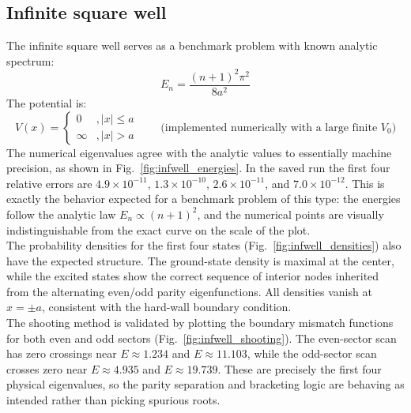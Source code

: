 \documentclass[11pt]{article}
\begin{document}
\begin{refsection}
        \subsection{Infinite square well}
            The infinite square well serves as a benchmark problem with known analytic spectrum:
            \begin{equation}
            E_n = \frac{(n+1)^2\pi^2}{8a^2}
            \end{equation}
            The potential is:
            \begin{equation}
            V(x)=\begin{cases}
            0 & ,|x|\le a\\
            \infty & ,|x|>a
            \end{cases}
            \qquad \text{(implemented numerically with a large finite }V_0\text{)}
            \end{equation}
            The numerical eigenvalues agree with the analytic values to essentially machine precision, as shown in Fig.~\ref{fig:infwell_energies}. In the saved run the first four relative errors are $4.9\times10^{-11}$, $1.3\times10^{-10}$, $2.6\times10^{-11}$, and $7.0\times10^{-12}$. This is exactly the behavior expected for a benchmark problem of this type: the energies follow the analytic law $E_n \propto (n+1)^2$, and the numerical points are visually indistinguishable from the exact curve on the scale of the plot. \\

            The probability densities for the first four states (Fig.~\ref{fig:infwell_densities}) also have the expected structure. The ground-state density is maximal at the center, while the excited states show the correct sequence of interior nodes inherited from the alternating even/odd parity eigenfunctions. All densities vanish at $x=\pm a$, consistent with the hard-wall boundary condition. \\

            The shooting method is validated by plotting the boundary mismatch functions for both even and odd sectors (Fig.~\ref{fig:infwell_shooting}). The even-sector scan has zero crossings near $E\approx1.234$ and $E\approx11.103$, while the odd-sector scan crosses zero near $E\approx4.935$ and $E\approx19.739$. These are precisely the first four physical eigenvalues, so the parity separation and bracketing logic are behaving as intended rather than picking spurious roots. \\


\end{refsection}
\end{document}
